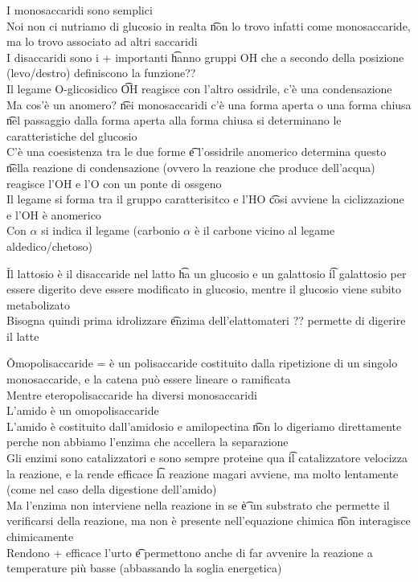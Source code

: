 \documentclass[12pt]{article}
\begin{document}
I monosaccaridi sono semplici \\
Noi non ci nutriamo di glucosio in realta \t non lo trovo infatti come monosaccaride, ma lo trovo associato ad altri saccaridi \\
I disaccaridi sono i + importanti \t hanno gruppi OH che a secondo della posizione (levo/destro) definiscono la funzione?? \\
Il legame O-glicosidico \t OH reagisce con l'altro ossidrile, c'è una condensazione \\
Ma cos'è un anomero? \t nei monosaccaridi c'è una forma aperta o una forma chiusa \t nel passaggio dalla forma aperta alla forma chiusa si determinano le caratteristiche del glucosio \\
C'è una coesistenza tra le due forme \t e l'ossidrile anomerico determina questo \t nella reazione di condensazione (ovvero la reazione che produce dell'acqua) reagisce l'OH e l'O con un ponte di ossgeno \\
Il legame si forma tra il gruppo caratterisitco e l'HO \t cosi avviene la ciclizzazione e l'OH è anomerico \\
Con $\alpha$ si indica il legame (carbonio $\alpha$ è il carbone vicino al legame aldedico/chetoso)

\v

Il lattosio è il disaccaride nel latto \t ha un glucosio e un galattosio \t il galattosio per essere digerito deve essere modificato in glucosio, mentre il glucosio viene subito metabolizato \\
Bisogna quindi prima idrolizzare \t enzima dell'elattomateri ?? permette di digerire il latte

\v

Omopolisaccaride = è un polisaccaride costituito dalla ripetizione di un singolo monosaccaride, e la catena può essere lineare o ramificata \\
Mentre eteropolisaccaride ha diversi monosaccaridi \\
L'amido è un omopolisaccaride \\
L'amido è costituito dall'amidosio e amilopectina \t non lo digeriamo direttamente perche non abbiamo l'enzima che accellera la separazione \\
Gli enzimi sono catalizzatori e sono sempre proteine qua \t il catalizzatore velocizza la reazione, e la rende efficace \t la reazione magari avviene, ma molto lentamente (come nel caso della digestione dell'amido) \\
Ma l'enzima non interviene nella reazione in se \t è un substrato che permette il verificarsi della reazione, ma non è presente nell'equazione chimica \t non interagisce chimicamente \\
Rendono + efficace l'urto \t e permettono anche di far avvenire la reazione a temperature più basse (abbassando la soglia energetica)
\end{document}

